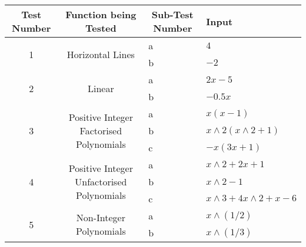 \documentclass[../../../../main.tex]{subfiles}
\begin{document}
\begin{table}[H]
\begin{tabular}{|c|c|l|l|}
\hline
Test Number        & Function being Tested                                      & \multicolumn{1}{c|}{Sub-Test Number} & Input               \\ \hline
\multirow{2}{*}{1} & \multirow{2}{*}{Horizontal Lines}                          & a                                    & $4$                 \\ \cline{3-4} 
                   &                                                            & b                                    & $-2$                \\ \hline
\multirow{2}{*}{2} & \multirow{2}{*}{Linear}                                    & a                                    & $2x-5$              \\ \cline{3-4} 
                   &                                                            & b                                    & $-0.5x$             \\ \hline
\multirow{3}{*}{3} & \multirow{3}{*}{Positive Integer Factorised Polynomials}   & a                                    & $x(x-1)$            \\ \cline{3-4} 
                   &                                                            & b                                    & $x\wedge 2(x\wedge 2+1)$        \\ \cline{3-4} 
                   &                                                            & c                                    & $-x(3x+1)$          \\ \hline
\multirow{3}{*}{4} & \multirow{3}{*}{Positive Integer Unfactorised Polynomials} & a                                    & $x\wedge 2+2x+1$          \\ \cline{3-4} 
                   &                                                            & b                                    & $x\wedge 2-1$             \\ \cline{3-4} 
                   &                                                            & c                                    & $x\wedge 3+4x\wedge 2+x-6$      \\ \hline
\multirow{2}{*}{5} & \multirow{2}{*}{Non-Integer Polynomials}                   & a                                    & $x\wedge (1/2)$           \\ \cline{3-4} 
                   &                                                            & b                                    & $x\wedge (1/3)$           \\ \hline

\end{tabular}
\end{table}
\end{document}
